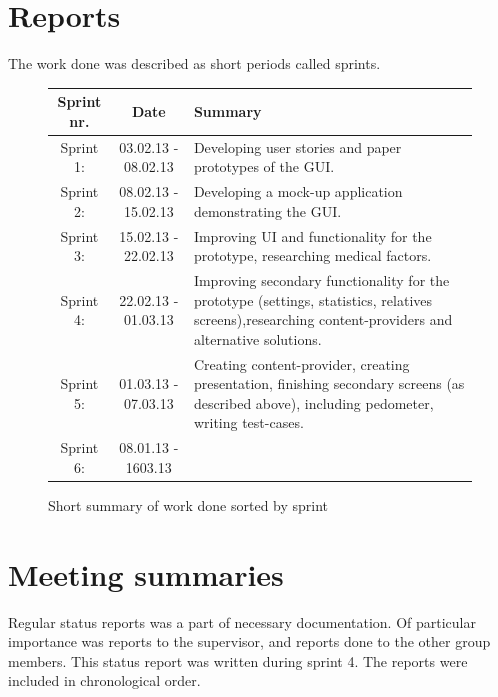 \section{Reports}
The work done was described as short periods called sprints. 
\begin{figure}
\caption{Short summary of work done sorted by sprint}
\begin{tabular}{|c|c|p{7cm}|}
\hline
Sprint nr. & Date & Summary\\
\hline
Sprint 1: & 03.02.13 - 08.02.13 & Developing user stories and paper prototypes of the GUI.\\ 
\hline
Sprint 2: & 08.02.13 - 15.02.13 & Developing a mock-up application demonstrating the GUI.\\
\hline
Sprint 3: & 15.02.13 - 22.02.13 & Improving UI and functionality for the prototype, researching medical factors. \\
\hline
Sprint 4: & 22.02.13 - 01.03.13 & Improving secondary functionality for the prototype (settings, statistics, relatives screens),researching content-providers and alternative solutions. \\
\hline
Sprint 5: & 01.03.13 - 07.03.13 & Creating content-provider, creating presentation, finishing secondary screens (as described above), including pedometer, writing test-cases.\\
\hline
Sprint 6: & 08.01.13 - 1603.13 &\\
\hline
\end{tabular} 
\label{tab:sprintList}
\end{figure}
\newpage

\section{Meeting summaries}
Regular status reports was a part of necessary documentation. Of particular importance was reports to the supervisor, and reports done to the other group members. This status report was written during sprint 4. The reports were included in chronological order.









